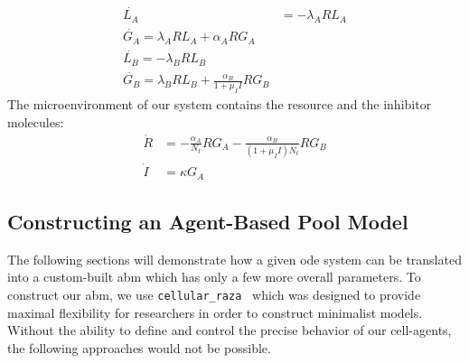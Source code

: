 \documentclass[10pt,A4paper]{article}
\numberwithin{equation}{section}
\begin{document}
%
\begin{align}
    \dot{L_A} &= -\lambda_A R L_A\\
    \dot{G_A} = \lambda_A R L_A + \alpha_A R G_A\\
    \dot{L_B} = -\lambda_B R L_B\\
    \dot{G_B} = \lambda_B R L_B + \frac{\alpha_B}{1 + \mu_I I} R G_B
    \label{eq:spatial_limit_F}
\end{align}
%
The microenvironment of our system contains the resource and the inhibitor molecules:
\begin{align}
    \dot{R} &= -\frac{\alpha_A}{N_t} R G_A-\frac{\alpha_B}{(1 + \mu_I I) N_t} R G_B \\
    \dot{I} &= \kappa G_A
    \label{eq:spatial_limit_H}
\end{align}

\subsection{Constructing an Agent-Based Pool Model}
The following sections will demonstrate how a given \ac{ode} system can be translated into a
custom-built \ac{abm} which has only a few more overall parameters.
To construct our \ac{abm}, we use \texttt{cellular\_raza}~\cite{Pleyer2025} which was designed to
provide maximal flexibility for researchers in order to construct minimalist models.
Without the ability to define and control the precise behavior of our cell-agents, the following
approaches would not be possible.
\end{document}
